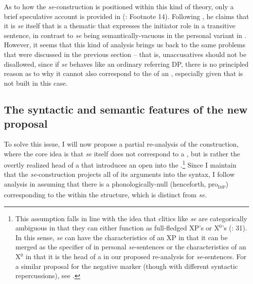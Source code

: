 \documentclass[output=paper,nonflat,newtxmath]{langsci/langscibook}
\begin{document}
As to how the  \textit{se}-construction is positioned within this kind of  theory, only a brief speculative account is provided in \citeauthor{schaffer2017} (\citeyear{schaffer2017}: Footnote 14). Following \citet{dalessandro2008}, he claims that it is \textit{se} itself that is a thematic  that expresses the initiator role in a transitive sentence, in contrast to \textit{se} being semantically-vacuous in the personal variant in . However, it seems that this kind of analysis brings us back to the same problems that were discussed in the previous section – that is, unaccusatives should not be disallowed, since if \textit{se} behaves like an ordinary referring DP, there is no principled reason as to why it cannot also correspond to the  of an , especially given that  is not built in this case.

\subsection{The syntactic and semantic features of the new proposal} \label{SyntacticSemanticProposal}

To solve this issue, I will now propose a partial re-analysis of the construction, where the core idea is that \textit{se} itself does not correspond to a , but is rather the overtly realized head of a  that introduces an open  into the .\footnote{This assumption falls in line with the idea that clitics like \textit{se} are categorically ambiguous in that they can either function as full-fledged XP’s or X$^0$’s (\citealt{boskovic2001}: 31). In this sense, \textit{se} can have the characteristics of an XP in that it can be merged as the specifier of  in personal \textit{se}-sentences  or the characteristics of an X$^0$ in that it is the head of a  in our proposed re-analysis for  \textit{se}-sentences. For a similar proposal for the  negative marker (though with different syntactic repercussions), see \citet{ilc2011}.}  Since I maintain that the  \textit{se}-construction projects all of its arguments into the syntax, I follow  analysis in assuming that there is a phonologically-null  (henceforth, pro\textsubscript{\textsc{imp}}) corresponding to the   within the structure, which is distinct from \textit{se}.
\end{document}
